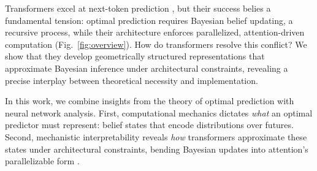 \documentclass{article}
\theoremstyle{plain}
\theoremstyle{definition}
\theoremstyle{remark}
\begin{document}


Transformers excel at next-token prediction \citep{vaswani2017attention}, but their success belies a fundamental tension: optimal prediction requires Bayesian belief updating, a recursive process, while their architecture enforces parallelized, attention-driven computation (Fig.~\ref{fig:overview}). How do transformers resolve this conflict? We show that they develop geometrically structured representations that approximate Bayesian inference under architectural constraints, revealing a precise interplay between theoretical necessity and implementation.


In this work, we combine insights from the theory of optimal prediction with neural network analysis.
First, computational mechanics \citep{Shalizi01_Computational, Marzen_2017, Riec18_SSAC1, Pepper24_RNNs, shai2024transformersrepresentbeliefstate} dictates \emph{what} an optimal predictor must represent: belief states that encode distributions over futures. Second, mechanistic interpretability reveals \textit{how} transformers approximate these states under architectural constraints, bending Bayesian updates into attention’s parallelizable form \citep{elhage2021mathematical, nanda2023mechanistic}.
\end{document}
